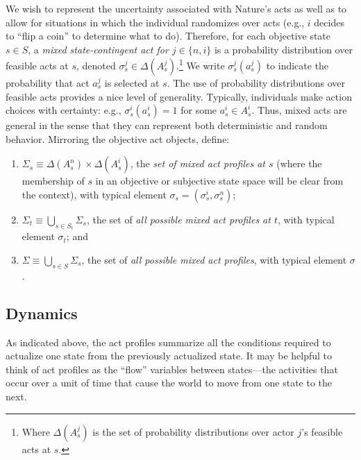 \documentclass[
11pt,
titlepage,
reqno,
]{article}%
\theoremstyle{definition}
\begin{document}
 We wish to represent the uncertainty associated with Nature's acts as well as to allow for situations in which the individual randomizes over acts (e.g., $i$ decides to ``flip a coin'' to determine what to do).
 Therefore, for each objective state $s\in S$, a \textit{mixed state-contingent act for $j\in\{n,i\}$} is a probability distribution over feasible acts at $s$, denoted $\sigma^j_s\in \Delta(A^j_{s})$.\footnote
 {
 	Where $\Delta(A^j_{s})$ is the set of probability distributions over actor $j$'s feasible acts at $s$. 
 } 
We write $\sigma^j_s(a^j_s)$ to indicate the probability that act $a^j_{s}$ is selected at $s$.
The use of probability distributions over feasible acts provides a nice level of generality.
Typically, individuals make action choices with certainty: e.g., $\sigma^i_s(a^i_s) =1$ for some $a^i_s\in A^i_s$.
Thus, mixed acts are general in the sense that they can represent both deterministic and random behavior.
Mirroring the objective act objects, define:
\begin{enumerate}
	\item $\Sigma_s\equiv \Delta(A^n_{s})\times\Delta(A^i_{s})$, the \textit{set of mixed act profiles at $s$} (where the membership of $s$ in an objective or subjective state space will be clear from the context), with typical element $\sigma_s=(\sigma^i_s,\sigma^n_s)$;
	\item $\Sigma_t\equiv \bigcup_{s\in S_t} \Sigma_s$, the set of \textit{all possible mixed act profiles at $t$}, with typical element $\sigma_t$; and
	\item $\Sigma\equiv \bigcup_{s\in S} \Sigma_s$, the set of \textit{all possible mixed act profiles}, with typical element $\sigma$.
\end{enumerate}

 
 
 
	
\subsection{Dynamics} 
	
As indicated above, the act profiles summarize all the conditions required to actualize one state from the previously actualized state. 	It may be helpful to think of act profiles as the ``flow'' variables between states---the activities that occur over a unit of time that cause the world to move from one state to the next.
	
\end{document}
